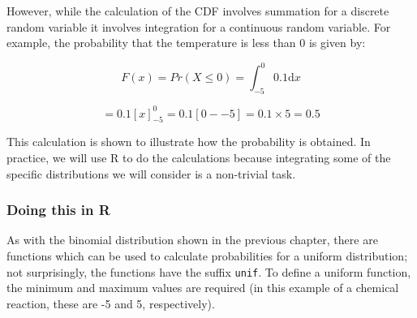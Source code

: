 \documentclass[
  oneside]{krantz}
\newenvironment{Shaded}{\begin{snugshade}}{\end{snugshade}}
\newcommand{\AttributeTok}[1]{\textcolor[rgb]{0.77,0.63,0.00}{#1}}
\newcommand{\CommentTok}[1]{\textcolor[rgb]{0.56,0.35,0.01}{\textit{#1}}}
\newcommand{\DecValTok}[1]{\textcolor[rgb]{0.00,0.00,0.81}{#1}}
\newcommand{\FloatTok}[1]{\textcolor[rgb]{0.00,0.00,0.81}{#1}}
\newcommand{\FunctionTok}[1]{\textcolor[rgb]{0.00,0.00,0.00}{#1}}
\newcommand{\NormalTok}[1]{#1}
\newcommand{\OtherTok}[1]{\textcolor[rgb]{0.56,0.35,0.01}{#1}}
\newcommand{\SpecialCharTok}[1]{\textcolor[rgb]{0.00,0.00,0.00}{#1}}
\newcommand{\StringTok}[1]{\textcolor[rgb]{0.31,0.60,0.02}{#1}}
\begin{document}
However, while the calculation of the CDF involves summation for a discrete random variable it involves integration for a continuous random variable. For example, the probability that the temperature is less than 0 is given by:

\[ F(x) = Pr(X \leq 0) = \int_{-5}^{0} 0.1 \mathrm{d}x \]

\[ = 0.1[x]_{-5}^{0} = 0.1[0 - -5] = 0.1 \times 5 = 0.5 \]

This calculation is shown to illustrate how the probability is obtained. In practice, we will use R to do the calculations because integrating some of the specific distributions we will consider is a non-trivial task.

\hypertarget{doing-this-in-r-6}{%
\subsubsection{Doing this in R}\label{doing-this-in-r-6}}

As with the binomial distribution shown in the previous chapter, there are functions which can be used to calculate probabilities for a uniform distribution; not surprisingly, the functions have the suffix \texttt{unif}. To define a uniform function, the minimum and maximum values are required (in this example of a chemical reaction, these are -5 and 5, respectively).

\begin{Shaded}
\end{Shaded}
\end{document}

